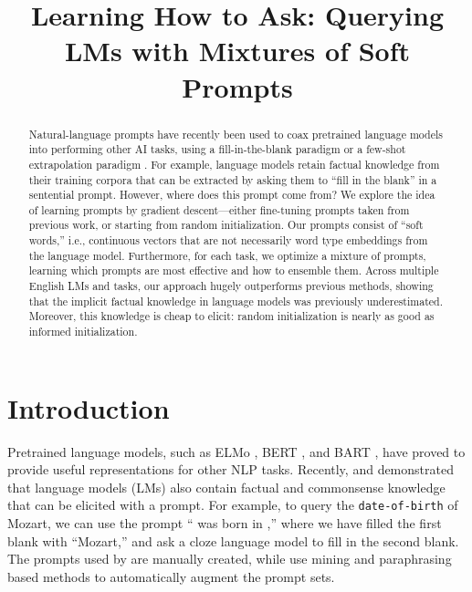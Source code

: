 \title{Learning How to Ask: Querying LMs with Mixtures of Soft Prompts}

\begin{abstract}
Natural-language prompts have recently been used to coax pretrained language models into performing other AI tasks, using a fill-in-the-blank paradigm \citep{petroniLanguageModelsKnowledge2019} or a few-shot extrapolation paradigm \cite{brownLanguageModelsAre2020}.  For example, language models retain factual knowledge from their training corpora that can be extracted by asking them to ``fill in the blank'' in a sentential prompt.  However, where does this prompt come from?  We explore the idea of learning prompts by gradient descent---either fine-tuning prompts taken from previous work, or starting from random initialization.  Our prompts consist of ``soft words,'' i.e., continuous vectors that are not necessarily word type embeddings from the language model.  Furthermore, for each task, we optimize a mixture of prompts, learning which prompts are most effective and how to ensemble them. Across multiple English LMs and tasks, our approach hugely outperforms previous methods, showing that the implicit factual knowledge in language models was previously underestimated.  Moreover, this knowledge is cheap to elicit: random initialization is nearly as good as informed initialization.
\end{abstract}

\section{Introduction}\label{sec:intro}

Pretrained language models, such as ELMo \citep{petersDeepContextualizedWord2018}, BERT \citep{devlinBERTPretrainingDeep2019}, and BART \citep{lewisBARTDenoisingSequencetoSequence2020}, have proved to provide useful representations for other NLP tasks.  Recently, \citet{petroniLanguageModelsKnowledge2019} and \citet{jiangHowCanWe2020} demonstrated that language models (LMs) also contain factual and commonsense knowledge that can be elicited with a prompt. For example, to query the \texttt{date-of-birth} of Mozart, we can use the prompt ``
  \uline{\phantom{Mozart}}
 was born in \underline{},'' where we have filled the first blank with ``Mozart,'' and ask a cloze language model to fill in the second blank. The prompts used by \citet{petroniLanguageModelsKnowledge2019} are manually created, while \citet{jiangHowCanWe2020} use mining and paraphrasing based methods to automatically augment the prompt sets.


